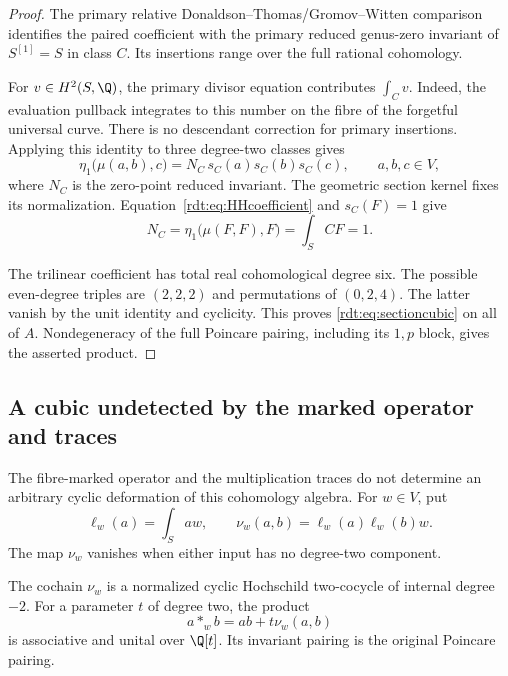 \begin{proof}
The primary relative Donaldson--Thomas/Gromov--Witten comparison
\cite[Definition 3.3 and Corollary 4.1]{NesterovK3}
identifies the paired coefficient with the primary reduced
genus-zero invariant of $S^{[1]}=S$ in class $C$.
Its insertions range over the full rational cohomology.

For $v\in H^2(S,\Q)$, the primary divisor equation contributes
$\int_Cv$. Indeed, the evaluation pullback integrates to this number
on the fibre of the forgetful universal curve.
There is no descendant correction for primary insertions.
Applying this identity to three degree-two classes gives
\[
 \eta_1\bigl(\mu(a,b),c\bigr)
      =N_C\,s_C(a)s_C(b)s_C(c),\qquad a,b,c\in V,
\]
where $N_C$ is the zero-point reduced invariant.
The geometric section kernel fixes its normalization.
Equation~\eqref{rdt:eq:HHcoefficient} and $s_C(F)=1$ give
\[
 N_C=\eta_1\bigl(\mu(F,F),F\bigr)=\int_SCF=1.
\]

The trilinear coefficient has total real cohomological degree six.
The possible even-degree triples are $(2,2,2)$ and permutations
of $(0,2,4)$. The latter vanish by the unit identity and cyclicity.
This proves \eqref{rdt:eq:sectioncubic} on all of $A$.
Nondegeneracy of the full Poincare pairing, including its $1,p$
block, gives the asserted product.
\end{proof}

\subsection{A cubic undetected by the marked operator and traces}

The fibre-marked operator and the multiplication traces do not
determine an arbitrary cyclic deformation of this cohomology algebra.
For $w\in V$, put
\[
 \ell_w(a)=\int_Saw,\qquad
 \nu_w(a,b)=\ell_w(a)\ell_w(b)w.
\]
The map $\nu_w$ vanishes when either input has no degree-two component.

\begin{lemma}\label{rdt:lem:rankonecubic}
The cochain $\nu_w$ is a normalized cyclic Hochschild two-cocycle
of internal degree $-2$.
For a parameter $t$ of degree two, the product
\[
 a*_w b=ab+t\nu_w(a,b)
\]
is associative and unital over $\Q[t]$.
Its invariant pairing is the original Poincare pairing.
\end{lemma}

